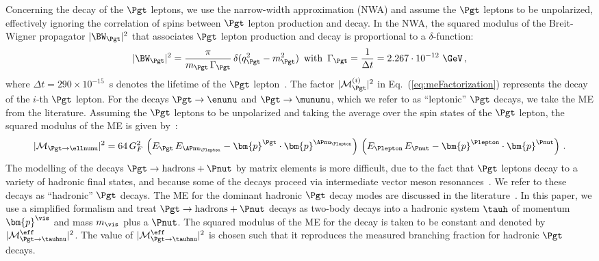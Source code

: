 Concerning the decay of the $\Pgt$ leptons,
we use the narrow-width approximation (NWA) and assume the $\Pgt$ leptons to be unpolarized,
effectively ignoring the correlation of spins between $\Pgt$
lepton production and decay.
In the NWA, the squared modulus of the Breit-Wigner propagator $\vert
\BW_{\Pgt} \vert^{2}$ that associates $\Pgt$ lepton production and
decay is proportional to a $\delta$-function:
\begin{equation}
\vert \BW_{\Pgt} \vert^{2} = \frac{\pi}{m_{\Pgt} \, \Gamma_{\Pgt}} \,
\delta ( q_{\Pgt}^{2} - m_{\Pgt}^{2} ) \, \mbox{ with } \, 
\Gamma_{\Pgt} = \frac{1}{\Delta t} =
 2.267 \cdot 10^{-12}\textrm{~\GeV} \, ,
\end{equation}
where $\Delta t = 290 \times 10^{-15}$~s denotes the lifetime of the
$\Pgt$ lepton~\cite{PDG}.
The factor $\vert \mathcal{M}^{(i)}_{\Pgt}
\vert^{2}$ in Eq.~(\ref{eq:meFactorization}) represents the decay of the $i$-th $\Pgt$ lepton.
For the decays $\Pgt \to \enunu$ and $\Pgt
\to \mununu$, which we refer to as ``leptonic'' $\Pgt$ decays, we take the ME from the literature.
Assuming the $\Pgt$ leptons to be unpolarized and taking the average over the spin states of the $\Pgt$ lepton,
the squared modulus of the ME is given by~\cite{Barger:1987nn}:
\begin{equation}
\vert\mathcal{M}_{\Pgt \to \ellnunu} \vert^{2} = 64 \, G^{2}_{F} \,
\left( E_{\Pgt} \, E_{\APnu_{\Plepton}} - \bm{p}^{\Pgt} \cdot
  \bm{p}^{\APnu_{\Plepton}} \right) \, \left( E_{\Plepton} \,
  E_{\Pnut} - \bm{p}^{\Plepton} \cdot \bm{p}^{\Pnut} \right) \, .
\label{eq:leptonic_tau_decays_ME}
\end{equation}
The modelling of the decays $\Pgt \to \textrm{hadrons} + \Pnut$ 
by matrix elements is more difficult, 
due to the fact that $\Pgt$ leptons decay to a variety of hadronic
final states, and because some of the decays proceed via intermediate vector
meson resonances~\cite{PDG}.
We refer to these decays as ``hadronic'' $\Pgt$ decays.
The ME for the dominant hadronic $\Pgt$ decay modes are discussed in the literature~\cite{Bullock:1992yt,Raychaudhuri:1995kv}.
In this paper, we use a simplified formalism and treat $\Pgt \to \textrm{hadrons} + \Pnut$ decays as two-body decays into a hadronic system $\tauh$ of momentum $\bm{p}^{\vis}$ and mass $m_{\vis}$ plus a $\Pnut$.
The squared modulus of the ME for the decay is taken to be constant and denoted by $\vert\mathcal{M}^{\eff}_{\Pgt \to \tauhnu}\vert^{2}$.
The value of $\vert\mathcal{M}^{\eff}_{\Pgt \to \tauhnu}\vert^{2}$ is
chosen such that it reproduces the measured branching fraction for hadronic $\Pgt$ decays.
